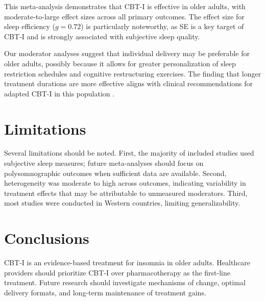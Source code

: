 \documentclass[
    language=english,
    doctype=meta-analysis,
    institution=none,
]{../../omnilatex}
\begin{document}
This meta-analysis demonstrates that CBT-I is effective in older adults, with
moderate-to-large effect sizes across all primary outcomes. The effect size for sleep
efficiency ($g = 0.72$) is particularly noteworthy, as SE is a key target of CBT-I
and is strongly associated with subjective sleep quality.

Our moderator analyses suggest that individual delivery may be preferable for older
adults, possibly because it allows for greater personalization of sleep restriction
schedules and cognitive restructuring exercises. The finding that longer treatment
durations are more effective aligns with clinical recommendations for adapted CBT-I
in this population \cite{mack2019cognitive}.

\section{Limitations}
\label{sec:limitations}

Several limitations should be noted. First, the majority of included studies used
subjective sleep measures; future meta-analyses should focus on polysomnographic
outcomes when sufficient data are available. Second, heterogeneity was moderate to
high across outcomes, indicating variability in treatment effects that may be
attributable to unmeasured moderators. Third, most studies were conducted in Western
countries, limiting generalizability.

\section{Conclusions}
\label{sec:conclusions}

CBT-I is an evidence-based treatment for insomnia in older adults. Healthcare
providers should prioritize CBT-I over pharmacotherapy as the first-line treatment.
Future research should investigate mechanisms of change, optimal delivery formats,
and long-term maintenance of treatment gains.



\end{document}
